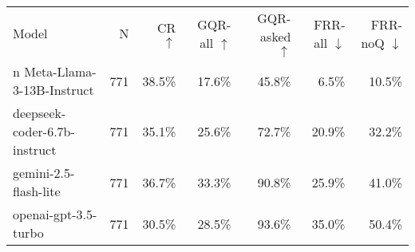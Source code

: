 \begin{tabular}{lrrrrrr}
\toprule
Model & N & CR $\uparrow$ & GQR-all $\uparrow$ & GQR-asked $\uparrow$ & FRR-all $\downarrow$ & FRR-noQ $\downarrow$ \\n\midrule
Meta-Llama-3-13B-Instruct & 771 & 38.5\% & 17.6\% & 45.8\% & 6.5\% & 10.5\% \\
deepseek-coder-6.7b-instruct & 771 & 35.1\% & 25.6\% & 72.7\% & 20.9\% & 32.2\% \\
gemini-2.5-flash-lite & 771 & 36.7\% & 33.3\% & 90.8\% & 25.9\% & 41.0\% \\
openai-gpt-3.5-turbo & 771 & 30.5\% & 28.5\% & 93.6\% & 35.0\% & 50.4\% \\
\bottomrule
\end{tabular}
